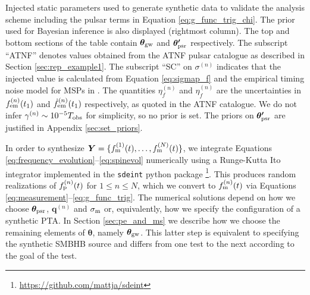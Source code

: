 \documentclass[fleqn,usenatbib,useAMS]{mnras}
\begin{document}
\begin{table}
		\caption{Injected static parameters used to generate synthetic data to validate the analysis scheme including the pulsar terms in Equation \eqref{eq:g_func_trig_chi}. The prior used for Bayesian inference is also displayed (rightmost column).  The top and bottom sections of the table contain $\boldsymbol{\theta}_{\rm gw}$ and $\boldsymbol{\theta'}_{\rm psr}$ respectively. The subscript ``ATNF'' denotes values obtained from the ATNF pulsar catalogue as described in Section \ref{sec:rep_example1}. The subscript ``SC'' on $\sigma^{(n)}$ indicates that the injected value is calculated from Equation \eqref{eq:sigmap_f} and the empirical timing noise model for MSPs in \protect \cite{Shannon2010}. The quantities $\eta^{(n)}_{f}$ and $\eta^{(n)}_{\dot{f}}$ are the uncertainties in $f^{(n)}_{\rm em} (t_1)$ and $\dot{f}^{(n)}_{\rm em} (t_1)$ respectively, as quoted in the ATNF catalogue. We do not infer $\gamma^{(n)} \sim 10^{-5} T_{\rm obs}$ for simplicity, so no prior is set. The priors on $\boldsymbol{\theta'}_{\rm psr}$ are justified in Appendix \ref{sec:set_priors}.
		}
		\label{tab:parameters_and_priors}
	\end{table}
In order to synthesize $\boldsymbol{Y} = \{f_{\rm m}^{(1)}(t), \dots, f_{\rm m}^{(N)}(t) \}$, we integrate Equations \eqref{eq:frequency_evolution}--\eqref{eq:spinevol} numerically using a Runge-Kutta It$\hat{\text{o}}$ integrator implemented in the \texttt{sdeint} python package \footnote{\url{https://github.com/mattja/sdeint}}. This produces random realizations of $f_{\rm p}^{(n)}(t)$ for $1\leq n \leq N$, which we convert to $f_{\rm m}^{(n)}(t)$ via Equations \eqref{eq:measurement}--\eqref{eq:g_func_trig}. The numerical solutions depend on how we choose $\boldsymbol{\theta}_{\rm psr}$, ${\boldsymbol{q}}^{(n)}$ and $\sigma_{\rm m}$ or, equivalently, how we specify the configuration of a synthetic PTA. In Section  \ref{sec:pe_and_ms} we describe how we choose the remaining elements of $\boldsymbol{\theta}$, namely $\boldsymbol{\theta}_{\rm gw}$. This latter step is equivalent to specifying the synthetic SMBHB source and differs from one test to the next according to the goal of the test.  \newline 
\end{document}

